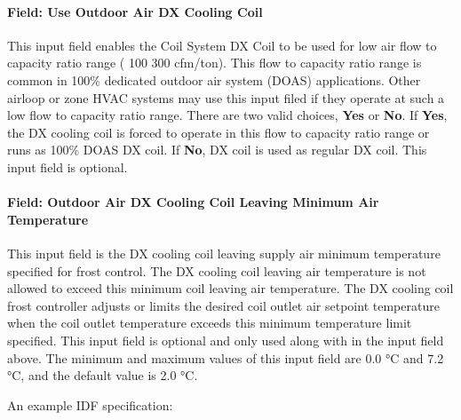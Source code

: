 \paragraph{Field: Use Outdoor Air DX Cooling Coil}\label{field-use-outdoor-air-dx-cooling-coil}

This input field enables the Coil System DX Coil to be used for low air flow to capacity ratio range ( 100 300 cfm/ton). This flow to capacity ratio range is common in 100\% dedicated outdoor air system (DOAS) applications. Other airloop or zone HVAC systems may use this input filed if they operate at such a low flow to capacity ratio range. There are two valid choices, \textbf{Yes} or \textbf{No}. If \textbf{Yes}, the DX cooling coil is forced to operate in this flow to capacity ratio range or runs as 100\% DOAS DX coil. If \textbf{No}, DX coil is used as regular DX coil. This input field is optional.

\paragraph{Field: Outdoor Air DX Cooling Coil Leaving Minimum Air Temperature}\label{field-outdoor-air-dx-cooling-coil-leaving-minimum-air-temperature}

This input field is the DX cooling coil leaving supply air minimum temperature specified for frost control. The DX cooling coil leaving air temperature is not allowed to exceed this minimum coil leaving air temperature. The DX cooling coil frost controller adjusts or limits the desired coil outlet air setpoint temperature when the coil outlet temperature exceeds this minimum temperature limit specified. This input field is optional and only used along with in the input field above. The minimum and maximum values of this input field are 0.0 °C and 7.2 °C, and the default value is 2.0 °C.

An example IDF specification:

